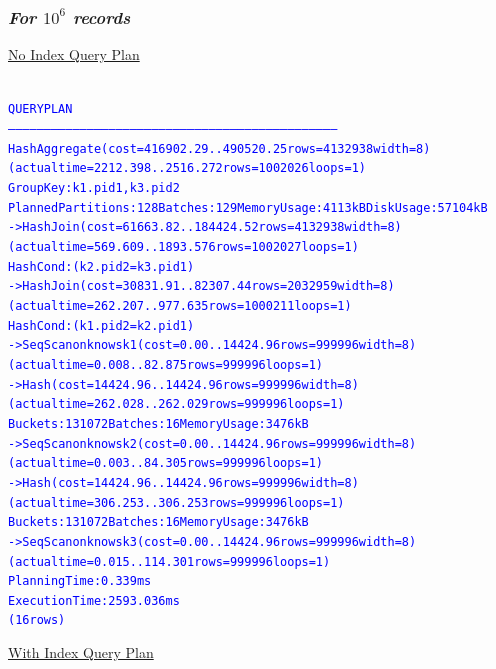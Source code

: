 \documentclass{article}
\begin{document}
    \subsubsection*{\emph{For $10^6$ records}}
    \underline{No Index Query Plan}
    \begin{center}
      {\tiny
      \begin{alltt}
      \textcolor{blue}{
        QUERY PLAN                                                                
        -----------------------------------------------------------------------------------------------------------------------------------------
         HashAggregate  (cost=416902.29..490520.25 rows=4132938 width=8) (actual time=2212.398..2516.272 rows=1002026 loops=1)
           Group Key: k1.pid1, k3.pid2
           Planned Partitions: 128  Batches: 129  Memory Usage: 4113kB  Disk Usage: 57104kB
           ->  Hash Join  (cost=61663.82..184424.52 rows=4132938 width=8) (actual time=569.609..1893.576 rows=1002027 loops=1)
                 Hash Cond: (k2.pid2 = k3.pid1)
                 ->  Hash Join  (cost=30831.91..82307.44 rows=2032959 width=8) (actual time=262.207..977.635 rows=1000211 loops=1)
                       Hash Cond: (k1.pid2 = k2.pid1)
                       ->  Seq Scan on knows k1  (cost=0.00..14424.96 rows=999996 width=8) (actual time=0.008..82.875 rows=999996 loops=1)
                       ->  Hash  (cost=14424.96..14424.96 rows=999996 width=8) (actual time=262.028..262.029 rows=999996 loops=1)
                             Buckets: 131072  Batches: 16  Memory Usage: 3476kB
                             ->  Seq Scan on knows k2  (cost=0.00..14424.96 rows=999996 width=8) (actual time=0.003..84.305 rows=999996 loops=1)
                 ->  Hash  (cost=14424.96..14424.96 rows=999996 width=8) (actual time=306.253..306.253 rows=999996 loops=1)
                       Buckets: 131072  Batches: 16  Memory Usage: 3476kB
                       ->  Seq Scan on knows k3  (cost=0.00..14424.96 rows=999996 width=8) (actual time=0.015..114.301 rows=999996 loops=1)
         Planning Time: 0.339 ms
         Execution Time: 2593.036 ms
        (16 rows)
       }
      \end{alltt}
      }
    \end{center}
    \underline{With Index Query Plan}
\end{document}
